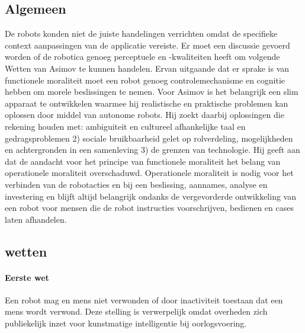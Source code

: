 \documentclass[11pt]{report}
\begin{document}
\subsection{Algemeen}
De robots konden niet de juiste handelingen verrichten omdat de specifieke context aanpassingen van de applicatie vereiste. Er moet een discussie gevoerd worden of de robotica genoeg perceptuele en -kwaliteiten heeft om volgende Wetten van Asimov te kunnen handelen. Ervan uitgaande dat er sprake is van functionele moraliteit moet een robot genoeg controlemechanisme en cognitie hebben om morele beslissingen te nemen.
Voor Asimov is het belangrijk een slim apparaat te ontwikkelen waarmee hij realistische  en praktische problemen kan oplossen door middel van autonome robots. Hij zoekt daarbij oplossingen die rekening houden met: ambiguiteit en cultureel afhankelijke taal en gedragsproblemen 2) sociale bruikbaarheid gelet op rolverdeling, mogelijkheden en achtergronden in een samenleving 3) de grenzen van technologie.
Hij geeft aan dat de aandacht voor het principe van functionele moraliteit het belang van operationele moraliteit overschaduwd. Operationele moraliteit is nodig voor het verbinden van de robotacties en bij een beslissing, aannames, analyse en investering en blijft altijd belangrijk ondanks de vergevorderde ontwikkeling van een robot voor mensen die de robot instructies voorschrijven, bedienen en cases laten afhandelen.

\subsection{wetten}
\paragraph{Eerste wet}

Een robot mag en mens niet verwonden of door inactiviteit toestaan dat een mens wordt verwond.
Deze stelling is verwerpelijk omdat overheden zich publiekelijk inzet voor kunstmatige intelligentie bij oorlogsvoering.
 
\end{document}
